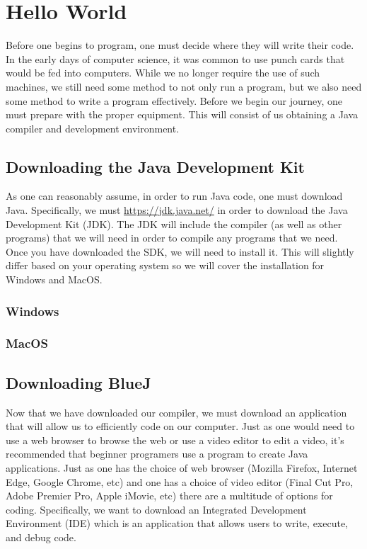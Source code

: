 



\chapter{Hello World}



Before one begins to program, one must decide where they will write their code.
In the early days of computer science, it was common to use punch cards that would be fed into computers.
While we no longer require the use of such machines, we still need some method to not only run a program, but we also need some method to write a program effectively.
Before we begin our journey, one must prepare with the proper equipment.
This will consist of us obtaining a Java compiler and development environment.


\section*{Downloading the Java Development Kit}
As one can reasonably assume, in order to run Java code, one must download Java.
Specifically, we must \url{https://jdk.java.net/} in order to download the Java Development Kit (JDK).
The JDK will include the compiler (as well as other programs) that we will need in order to compile any programs that we need.
Once you have downloaded the SDK, we will need to install it.
This will slightly differ based on your operating system so we will cover the installation for Windows and MacOS.


\subsection*{Windows}

\subsection*{MacOS}



\section*{Downloading BlueJ}
Now that we have downloaded our compiler, we must download an application that will allow us to efficiently code on our computer.
Just as one would need to use a web browser to browse the web or use a video editor to edit a video, it's recommended that beginner programers use a program to create Java applications.
Just as one has the choice of web browser (Mozilla Firefox, Internet Edge, Google Chrome, etc) and one has a choice of video editor (Final Cut Pro, Adobe Premier Pro, Apple iMovie, etc) there are a multitude of options for coding.
Specifically, we want to download an Integrated Development Environment (IDE) which is an application that allows users to write, execute, and debug code.

